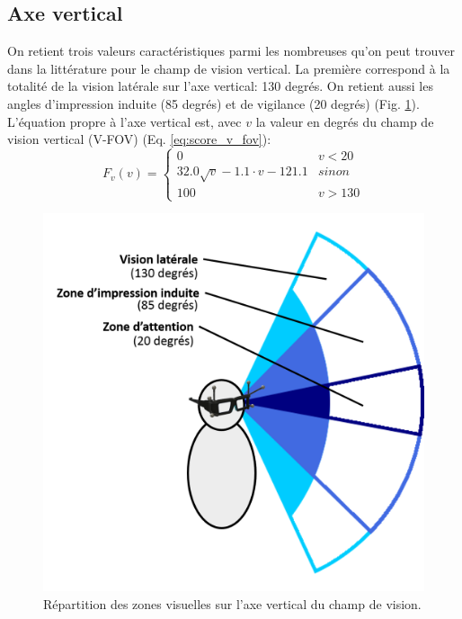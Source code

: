 	\subsection{Axe vertical}
	\par On retient trois valeurs caractéristiques parmi les nombreuses qu'on peut trouver dans la littérature pour le champ de vision vertical. La première correspond à la totalité de la vision latérale sur l'axe vertical: 130 degrés. On retient aussi les angles d'impression induite (85 degrés) et de vigilance (20 degrés) \citep{langlois_adas_2013} (Fig. \ref{fig:champ_vision_vertical}). L'équation propre à l'axe vertical est, avec $v$ la valeur en degrés du champ de vision vertical (V-FOV) (Eq. \ref{eq:score_v_fov}): 
	\begin{equation}
	F_v(v) = \begin{cases}
	0 & v < 20\\
	32.0 \sqrt{v} -1.1 \cdot v -121.1 & sinon\\
	100 & v > 130
	\end{cases}
	\label{eq:score_v_fov}
	\end{equation}
	
	\begin{figure}
		\centering
		\includegraphics[scale=.6]{Figures/ChampVisionVertical}
		\caption{Répartition des zones visuelles sur l'axe vertical du champ de vision.}
		\label{fig:champ_vision_vertical}
	\end{figure}
	
